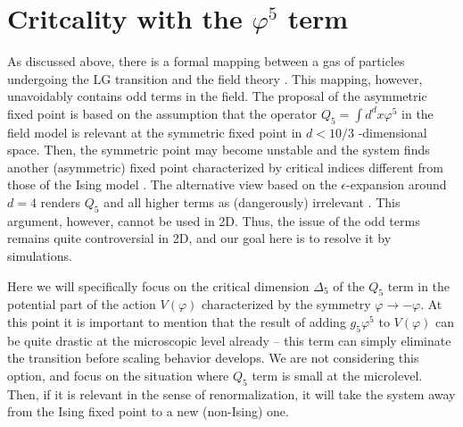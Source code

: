 \documentclass[prb,aps,twocolumn,groupedaddress,floats,showpacs,final]{revtex4}
\begin{document}
\section{Critcality with the $\varphi^5$ term}
As discussed above, there is a formal mapping between a gas of particles undergoing the LG transition and the field theory \cite{Hubbard}. This mapping, however, unavoidably contains odd terms in the field.  
The proposal \cite{Hertz} of the asymmetric fixed point is based on the assumption that the operator $Q_5 = \int d^dx \varphi^5$ in the field model is relevant at the symmetric fixed point in $d<10/3$ -dimensional space. Then, the symmetric point may become unstable and the system finds another (asymmetric) fixed point characterized by critical indices different from those of the Ising model \cite{Hertz}. 
The alternative view based on the $\epsilon$-expansion around $d=4$  renders $Q_5$ and all higher terms as (dangerously) irrelevant \cite{Nicoll}. This argument, however, cannot be used in 2D. Thus, the issue of the odd terms remains quite controversial in 2D, and our goal here is to resolve it by simulations.

Here we will specifically focus on the critical dimension $\Delta_5$ of the $Q_5$ term in the potential part of the action $V(\varphi)$ characterized by the symmetry $\varphi \to - \varphi$. At this point it is important to mention that the result of adding $g_5 \varphi^5 $ to $V(\varphi)$ can be quite drastic at the microscopic level already -- this term can simply eliminate the transition before scaling behavior develops. We are not considering this option, and focus on the situation where $Q_5$ term is small at the microlevel. Then, if it is relevant in the sense of renormalization, it will take  the system away from the Ising fixed point to a new (non-Ising) one. 
\end{document}

